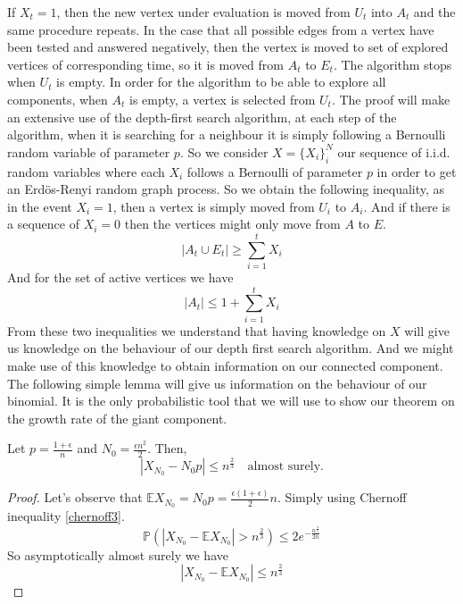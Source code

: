 If $X_t = 1$, then the new vertex under evaluation is moved from $U_t$ into $A_t$ and the same procedure repeats. 
In the case that all possible edges from a vertex have been tested and answered negatively, then the vertex is moved to set of explored vertices of corresponding time, so it is moved from $A_t$ to $E_t$.
The algorithm stops when $U_t$ is empty.
\newline
In order for the algorithm to be able to explore all components, when $A_t$ is empty, a vertex is selected from $U_t$.
\newline
The proof will make an extensive use of the depth-first search algorithm, at each step of the algorithm, when it is searching for a neighbour it is simply following a Bernoulli random variable of parameter $p$.
So we consider $X = \{X_i\}_i^N$ our sequence of i.i.d. random variables where each $X_i$ follows a Bernoulli of parameter $p$ in order to get an Erd\"os-Renyi random graph process.
So we obtain the following inequality, as in the event $X_i = 1$, then a vertex is simply moved from $U_i$ to $A_i$. And if there is a sequence of $X_i = 0$ then the vertices might only move from $A$ to $E$.  
\begin{equation}
	|A_t \cup E_t| \geq \sum_{i=1}^t X_i
\end{equation} 
And for the set of active vertices we have
\begin{equation}\label{eq:At}
	|A_t| \leq 1 + \sum_{i=1}^t X_i
\end{equation}
From these two inequalities we understand that having knowledge on $X$ will give us knowledge on the behaviour of our depth first search algorithm. And we might make use of this knowledge to obtain information on our connected component.
\newline
The following simple lemma will give us information on the behaviour of our binomial. It is the only probabilistic tool that we will use to show our theorem on the growth rate of the giant component.
\begin{lemma}\label{lemmaN0}
	Let $p = \frac{1+\epsilon}{n}$ and $N_0 = \frac{\epsilon n^2}{2}$. Then, 
	\begin{equation}
		|X_{N_0} - N_0 p| \leq n^{\frac{2}{3}} \quad \text{almost surely.}
	\end{equation}
\end{lemma}
\begin{proof}
	Let's observe that $\mathbb{E}X_{N_0} = N_0 p = \frac{\epsilon(1+\epsilon)}{2}n$.
	Simply using Chernoff inequality \ref{chernoff3}.
	\begin{equation}
		\mathbb{P}(|X_{N_0} - \mathbb{E}X_{N_0}| > n^{\frac{2}{3}} ) \leq 2 e^{-\frac{n^{\frac{4}{3}}}{2n}}
	\end{equation}
	So asymptotically almost surely we have 
	\begin{equation}
		|X_{N_0} - \mathbb{E}X_{N_0}| \leq n^{\frac{2}{3}}
	\end{equation}
\end{proof}
